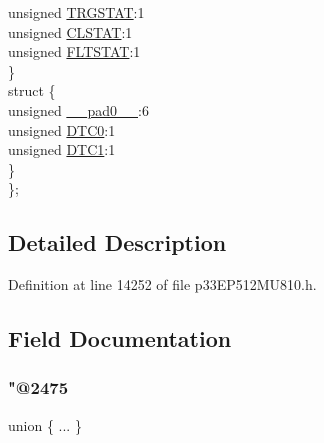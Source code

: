 \begin{DoxyCompactItemize}
\begin{tabbing}
\>\>unsigned \hyperlink{structtag_p_w_m_c_o_n2_b_i_t_s_a57c6135a12bae69a2a2cac5ed50a4a6d}{TRGSTAT}:1\\
\>\>unsigned \hyperlink{structtag_p_w_m_c_o_n2_b_i_t_s_a3ff6da0b6372a30fc64f07d769a3ddab}{CLSTAT}:1\\
\>\>unsigned \hyperlink{structtag_p_w_m_c_o_n2_b_i_t_s_ac4cd94e1f740f5bc85b265ed453769f0}{FLTSTAT}:1\\
\>\} \\
\>struct \{\\
\>\>unsigned \hyperlink{structtag_p_w_m_c_o_n2_b_i_t_s_adf71f3d8410c1f1dbbc96680a92c49af}{\_\_pad0\_\_}:6\\
\>\>unsigned \hyperlink{structtag_p_w_m_c_o_n2_b_i_t_s_a9aea5589386f8c7d9cb07683fc730825}{DTC0}:1\\
\>\>unsigned \hyperlink{structtag_p_w_m_c_o_n2_b_i_t_s_a41e45e30f2c99c731b1d2bca6060d8ad}{DTC1}:1\\
\>\} \\
\}; \\

\end{tabbing}\end{DoxyCompactItemize}


\subsection{Detailed Description}


Definition at line 14252 of file p33\+E\+P512\+M\+U810.\+h.



\subsection{Field Documentation}
\mbox{\label{structtag_p_w_m_c_o_n2_b_i_t_s_a3c3adf1b0f5d5dc88239ff92bf746b55}} 
\subsubsection{\texorpdfstring{"@2475}{@2475}}
{\footnotesize\ttfamily union \{ ... \} }

\mbox{\label{structtag_p_w_m_c_o_n2_b_i_t_s_adf71f3d8410c1f1dbbc96680a92c49af}} 
